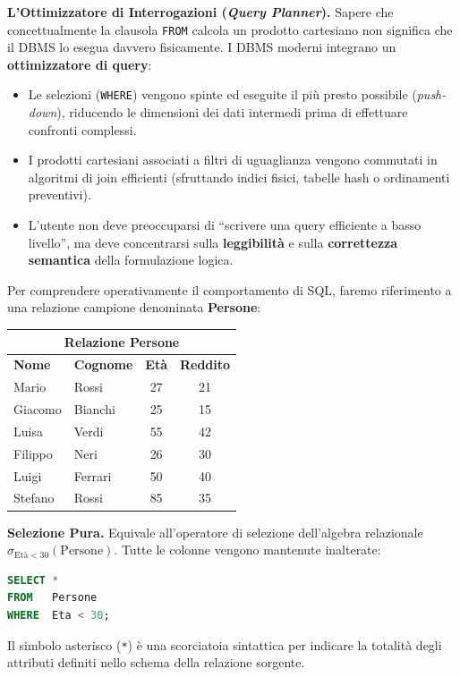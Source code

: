 \documentclass[12pt]{extarticle}
\begin{document}
\medskip
\noindent \textbf{L'Ottimizzatore di Interrogazioni (\textit{Query Planner}).} Sapere che concettualmente la clausola \texttt{FROM} calcola un prodotto cartesiano non significa che il DBMS lo esegua davvero fisicamente. I DBMS moderni integrano un \textbf{ottimizzatore di query}:
\begin{itemize}
    \item Le selezioni (\texttt{WHERE}) vengono spinte ed eseguite il più presto possibile (\textit{push-down}), riducendo le dimensioni dei dati intermedi prima di effettuare confronti complessi.
    \item I prodotti cartesiani associati a filtri di uguaglianza vengono commutati in algoritmi di join efficienti (sfruttando indici fisici, tabelle hash o ordinamenti preventivi).
    \item L'utente non deve preoccuparsi di ``scrivere una query efficiente a basso livello'', ma deve concentrarsi sulla \textbf{leggibilità} e sulla \textbf{correttezza semantica} della formulazione logica.
\end{itemize}

\noindent Per comprendere operativamente il comportamento di SQL, faremo riferimento a una relazione campione denominata \textbf{Persone}:

\begin{center}
\small
\begin{tabular}{llcc}
    \toprule
    \multicolumn{4}{c}{\textbf{Relazione Persone}} \\
    \midrule
    \textbf{Nome} & \textbf{Cognome} & \textbf{Età} & \textbf{Reddito} \\
    \midrule
    Mario   & Rossi   & 27 & 21 \\
    Giacomo & Bianchi & 25 & 15 \\
    Luisa   & Verdi   & 55 & 42 \\
    Filippo & Neri    & 26 & 30 \\
    Luigi   & Ferrari & 50 & 40 \\
    Stefano & Rossi   & 85 & 35 \\
    \bottomrule
\end{tabular}
\end{center}

\medskip
\noindent \textbf{Selezione Pura.} Equivale all'operatore di selezione dell'algebra relazionale $\sigma_{\text{Età} < 30}(\text{Persone})$. Tutte le colonne vengono mantenute inalterate:
\begin{lstlisting}[language=SQL]
SELECT *
FROM   Persone
WHERE  Eta < 30;
\end{lstlisting}
Il simbolo asterisco (\texttt{*}) è una scorciatoia sintattica per indicare la totalità degli attributi definiti nello schema della relazione sorgente.
\end{document}
